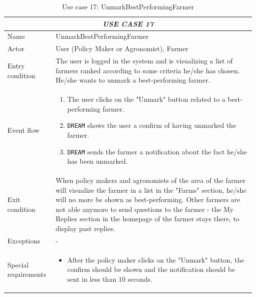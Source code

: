 \documentclass{article}
\begin{document}
\centering
\begin{longtable}{|p{3.5cm}|m{8cm}|}
\caption{Use case 17: UnmarkBestPerformingFarmer}
 \label{uc17}
 \hline
 \multicolumn{2}{|c|}{\cellcolor{white}\emph{USE CASE 17}} \\
 \endfirsthead
 \endhead
 \endfoot
 \endlastfoot
 \hline
 Name & UnmarkBestPerformingFarmer\\
 \hline
 Actor & User (Policy Maker or Agronomist), Farmer\\
 \hline
 Entry condition & The user is logged in the system and is visualizing a list of farmers ranked according to some criteria he/she has chosen. He/she wants to unmark a best-performing farmer.\\
 \hline
 Event flow & \begin{enumerate}
    \item The user clicks on the "Unmark" button related to a best-performing farmer.
    \item \verb|DREAM| shows the user a confirm of having unmarked the farmer.
    \item \verb|DREAM| sends the farmer a notification about the fact he/she has been unmarked.
 \end{enumerate}\\
 \hline
 Exit condition &  When policy makers and agronomists of the area of the farmer will visualize the farmer in a list in the "Farms" section, he/she will no more be shown as best-performing.
 Other farmers are not able anymore to send questions to the farmer - the My Replies section in the homepage of the farmer stays there, to display past replies.\\
 \hline
 Exceptions & -\\
 \hline
 Special requirements &\begin{itemize}
     \item After the policy maker clicks on the "Unmark" button, the confirm should be shown and the notification should be sent in less than 10 seconds.
 \end{itemize}\\
 \hline
\end{longtable}
\end{document}
